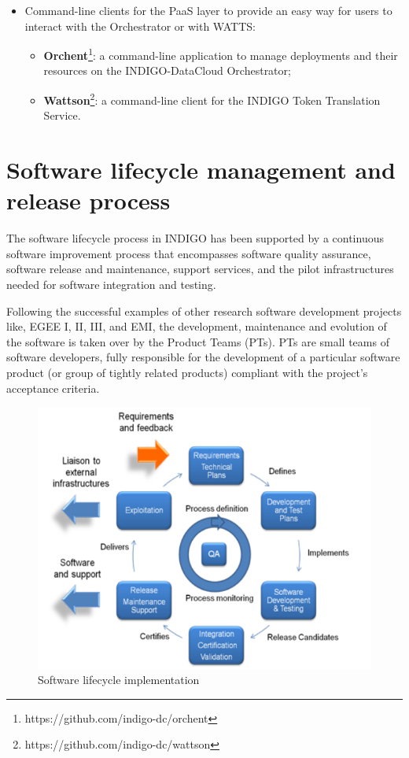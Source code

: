 \documentclass{article}
\begin{document}
\begin{itemize}
\item Command-line clients for the PaaS layer to provide an easy way for users to interact with the Orchestrator or with WATTS:
\begin{itemize}
\item {\bf Orchent}\footnote{https://github.com/indigo-dc/orchent}: a command-line application to manage deployments and their resources on the INDIGO-DataCloud Orchestrator;
\item {\bf Wattson}\footnote{https://github.com/indigo-dc/wattson}: a command-line client for the INDIGO Token Translation Service.
\end{itemize}

\end{itemize}





\section{Software lifecycle management and release process}
\label{sec:release}

The software lifecycle process in INDIGO has
been supported by a continuous software improvement process that
encompasses software quality assurance, software
release and maintenance, support services, and the pilot infrastructures needed
for software integration and testing.

Following the successful examples of other research software
development projects like, EGEE I, II, III, and EMI, the development,
maintenance and evolution of the software is taken over by the Product Teams (PTs). PTs are small teams of software developers, fully responsible for the development of a particular software product (or group of tightly related products) compliant with the project's acceptance criteria.

\begin{figure}
  \centering
  \includegraphics[width=\textwidth]{./figs/Figure5.pdf}
  \caption{Software lifecycle implementation}
  \label{fig:5}
\end{figure}
\end{document}
